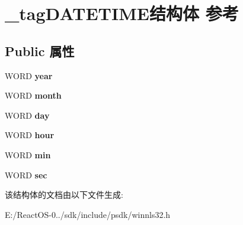 \hypertarget{struct__tag_d_a_t_e_t_i_m_e}{}\section{\+\_\+tag\+D\+A\+T\+E\+T\+I\+M\+E结构体 参考}
\label{struct__tag_d_a_t_e_t_i_m_e}
\subsection*{Public 属性}
\begin{DoxyCompactItemize}
\item 
\mbox{\label{struct__tag_d_a_t_e_t_i_m_e_aea7d4ec1c775e67064077701dbd51484}} 
W\+O\+RD {\bfseries year}
\item 
\mbox{\label{struct__tag_d_a_t_e_t_i_m_e_ae5787a85838e9fd76ef3e1f51746aada}} 
W\+O\+RD {\bfseries month}
\item 
\mbox{\label{struct__tag_d_a_t_e_t_i_m_e_a1147d32fc6378d9157e32702c363f388}} 
W\+O\+RD {\bfseries day}
\item 
\mbox{\label{struct__tag_d_a_t_e_t_i_m_e_adaa5140b464b8cf76b392984093ba24b}} 
W\+O\+RD {\bfseries hour}
\item 
\mbox{\label{struct__tag_d_a_t_e_t_i_m_e_a35d686d807031bdf98ede91551e1a847}} 
W\+O\+RD {\bfseries min}
\item 
\mbox{\label{struct__tag_d_a_t_e_t_i_m_e_ad1137dbf9525a4e1333c38ae0cd47f3b}} 
W\+O\+RD {\bfseries sec}
\end{DoxyCompactItemize}


该结构体的文档由以下文件生成\+:\begin{DoxyCompactItemize}
\item 
E\+:/\+React\+O\+S-\/0../sdk/include/psdk/winnls32.\+h\end{DoxyCompactItemize}
